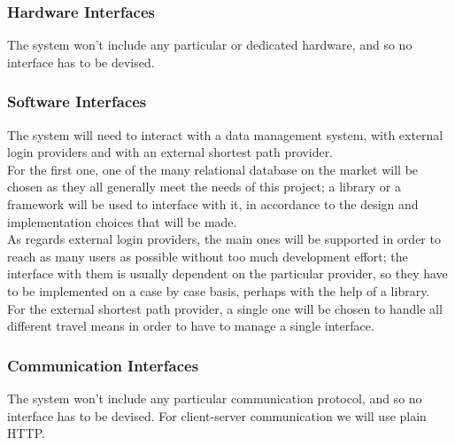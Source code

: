 \subsubsection{Hardware Interfaces}

The system won't include any particular or dedicated hardware, and so no interface has to be devised.


\subsubsection{Software Interfaces}
The system will need to interact with a data management system, with external login providers and with an external shortest path provider.\\
For the first one, one of the many relational database on the market will be chosen as they all generally meet the needs of this project; a library or a framework will be used to interface with it, in accordance to the design and implementation choices that will be made.\\
As regards external login providers, the main ones will be supported in order to reach as many users as possible without too much development effort; the interface with them is usually dependent on the particular provider, so they have to be implemented on a case by case basis, perhaps with the help of a library.\\
For the external shortest path provider, a single one will be chosen to handle all different travel means in order to have to manage a single interface.

\subsubsection{Communication Interfaces}

The system won't include any particular communication protocol, and so no interface has to be devised. For client-server communication we will use plain HTTP.